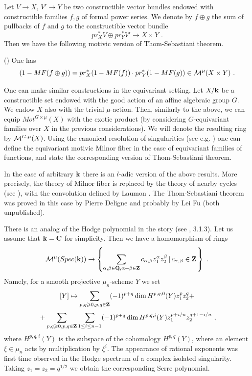 \documentclass[12pt]{article}
\begin{document}
Let $V\to X,\,V'\to Y$ be two constructible vector bundles endowed with constructible families $f,g$ of formal power series.
We denote by $f\oplus g$ the sum of pullbacks of $f$ and $g$ to the constructible vector
bundle 
$$pr_X^*V\oplus pr_Y^*V'\to X\times Y\,\,.$$
Then we have the following motivic version of Thom-Sebastiani theorem.

\begin{thm}(\cite{DeLo2}) One has
$$(1-MF(f\oplus g))=pr_X^*(1-MF(f))\cdot
pr_Y^*(1-MF(g))\in {\cal M}^\mu (X\times Y)\,\,.$$
\end{thm}


One can make similar constructions in the equivariant setting. 
Let  $X/{\bf k}$ be a constructible set endowed with the good action
of an  affine algebraic group $G$. We  endow $X$ also with the trivial $\mu$-action. Then, similarly to the above, we can equip $Mot^{G\times \mu}(X)$ with the exotic product (by considering $G$-equivariant families over $X$ in the previous considerations). We will denote the resulting ring by ${\cal M}^{G,\mu}(X)$.  Using the 
canonical resolution of singularities (see e.g. \cite{BiMi}) one can define the equivariant motivic Milnor fiber in 
the case of equivariant families of functions, and state the corresponding version of  Thom-Sebastiani theorem.


In the case of arbitrary ${\bf k}$ there is an $l$-adic version of the above results. More precisely, the theory of Milnor fiber is replaced by the theory of nearby cycles (see \cite{SGA}), with the convolution defined by Laumon \cite{Lau}. The Thom-Sebastiani theorem was proved in this case by Pierre Deligne and probably by Lei Fu (both unpublished).

There is an analog of the Hodge polynomial in the story (see \cite{DeLo1}, 3.1.3). Let us assume that ${\bf k}={\bf C}$ for simplicity. Then we have a homomorphism of rings 
$${\cal M}^{\mu}(Spec({\bf k}))\to \left\{\sum_{\alpha,\beta\in {\bf Q},\alpha+\beta\in {\bf Z}}c_{\alpha,\beta}z_1^{\alpha}z_2^{\beta}\left|\,c_{\alpha,\beta}\in {\bf Z}\right.\right\}\,\,.$$
 Namely, for a smooth projective $\mu_n$-scheme $Y$ we set
$$[Y]\mapsto \sum_{p,q\geqslant 0, p,q\in {\bf Z}}(-1)^{p+q}\dim H^{p,q,0}(Y)z_1^pz_2^q+$$
$${}+\sum_{p,q\geqslant 0, p,q\in {\bf Z}}\sum_{1\le i\le n-1}(-1)^{p+q}\dim H^{p,q,i}(Y)z_1^{p+i/n}z_2^{q+1-i/n}\,\,,$$
where $H^{p,q,i}(Y)$ is the subspace of the cohomology $H^{p,q}(Y)$, where an element $\xi\in \mu_n$ acts by multiplication by $\xi^i$. The appearance of rational exponents was first time observed in the Hodge spectrum of a  complex isolated
singularity.
Taking $z_1=z_2=q^{1/2}$ we obtain the corresponding Serre polynomial.
\end{document}
